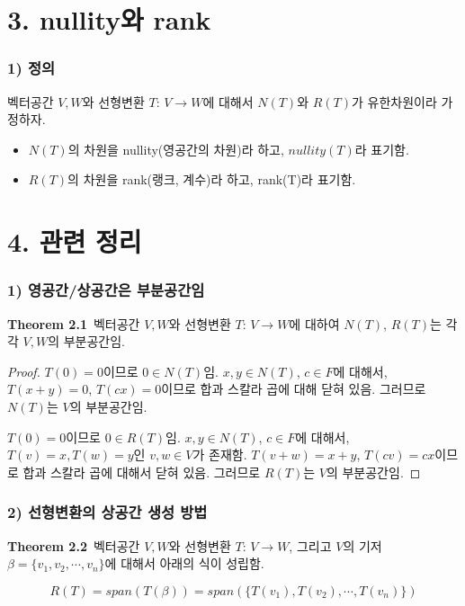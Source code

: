 \section*{3. nullity와 rank}
\subsubsection*{1) 정의\\}
\begin{DEF}
벡터공간 $V,W$와 선형변환 $T:\,V \rightarrow W$에 대해서 $N(T)$와 $R(T)$가 유한차원이라 가정하자.

\begin{itemize}
    \item $N(T)$의 차원을 nullity(영공간의 차원)라 하고, $nullity(T)$라 표기함.
    \item $R(T)$의 차원을 rank(랭크, 계수)라 하고, rank(T)라 표기함.
\end{itemize}
\end{DEF}

\section*{4. 관련 정리}
\subsubsection*{1) 영공간/상공간은 부분공간임}
\textbf{Theorem 2.1}\, 벡터공간 $V, W$와 선형변환 $T:\,V \rightarrow W$에 대하여 $N(T)$, $R(T)$는 각각 $V, W$의 부분공간임.

\begin{proof}
$T(0)=0$이므로 $0 \in N(T)$임. $x,y \in N(T)$, $c \in F$에 대해서, $T(x+y)=0$, $T(cx)=0$이므로 합과 스칼라 곱에 대해 닫혀 있음. 그러므로 $N(T)$는 $V$의 부분공간임.

$T(0)=0$이므로 $0 \in R(T)$임. $x,y \in N(T)$, $c \in F$에 대해서, $T(v)=x, T(w)=y$인 $v,w \in V$가 존재함. $T(v+w)=x+y$, $T(cv)=cx$이므로 합과 스칼라 곱에 대해서 닫혀 있음. 그러므로 $R(T)$는 $V$의 부분공간임.
\end{proof}

\subsubsection*{2) 선형변환의 상공간 생성 방법}
\textbf{Theorem 2.2}\, 벡터공간 $V, W$와 선형변환 $T:\,V \rightarrow W$, 그리고 $V$의 기저 $\beta = \{v_1,v_2, \cdots ,v_n\}$에 대해서 아래의 식이 성립함.

\[
R(T)=span(T(\beta))=span(\{T(v_1),T(v_2), \cdots ,T(v_n)\})
\]

